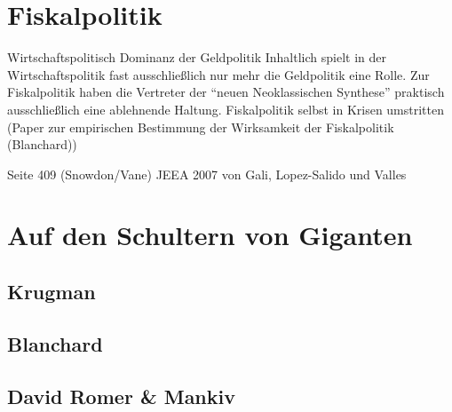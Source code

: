 \section{Fiskalpolitik}
\label{NeueFiskal}

Wirtschaftspolitisch Dominanz der Geldpolitik
Inhaltlich spielt in der Wirtschaftspolitik fast ausschließlich nur mehr die Geldpolitik eine Rolle. Zur Fiskalpolitik haben die Vertreter der "`neuen Neoklassischen Synthese"' praktisch ausschließlich eine ablehnende Haltung.
Fiskalpolitik selbst in Krisen umstritten (Paper zur empirischen Bestimmung der Wirksamkeit der Fiskalpolitik (Blanchard))

\textcite[S. 130]{Christiano2018}




Seite 409 (Snowdon/Vane)
\parencite{Woodford2011}
JEEA 2007 von Gali, Lopez-Salido und Valles 


\section{Auf den Schultern von Giganten}
\label{Giganten}

\subsection{Krugman}

\subsection{Blanchard}

\subsection{David Romer \& Mankiv}










